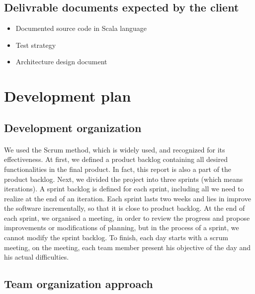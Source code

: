 \documentclass{report}
\begin{document}
\subsection{Delivrable documents expected by the client}

\vspace{3mm}
\begin{itemize}
\item Documented source code in Scala language\vspace{1mm}
\item Test strategy\vspace{1mm}
\item Architecture design document\vspace{1mm}
\end{itemize}

\section{Development plan}

\subsection{Development organization }

\paragraph{}
\hspace{4mm}\textnormal{We used the Scrum method, which is widely used, 
and recognized for its effectiveness. At first, 
we defined a product backlog containing all desired 
functionalities in the final product. In fact, this report is also a part 
of the product backlog. Next, we divided the project into three
 sprints (which means iterations). A sprint backlog is defined for 
each sprint, including all we need to realize at the end of an 
iteration. Each sprint lasts two weeks and lies in improve the 
software incrementally, so that it is close to product backlog. 
At the end of each sprint, we organised a meeting, in order to 
review the progress and propose improvements or modifications
 of planning, but in the process of a sprint, we cannot modify the 
sprint backlog. To finish, each day starts with a scrum meeting, on 
the meeting, each team member present his objective of the day
 and his actual difficulties.}

\subsection{Team organization approach}
\end{document}
